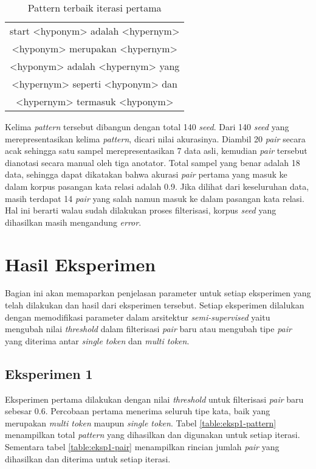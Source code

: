 \begin{table}
  \centering
  \caption{Pattern terbaik iterasi pertama}
  \label{table:pattern1}
  \begin{tabular}{|c|}
    \hline
      start <hyponym> adalah <hypernym> \\
      <hyponym> merupakan <hypernym> \\ 
      <hyponym> adalah <hypernym> yang \\
      <hypernym> seperti <hyponym> dan \\
      <hypernym> termasuk <hyponym> \\ \hline
  \end{tabular}
\end{table}

Kelima \textit{pattern} tersebut dibangun dengan total 140 \textit{seed}. Dari 140 \textit{seed} yang merepresentasikan kelima \textit{pattern}, dicari nilai akurasinya. Diambil 20 \textit{pair} secara acak sehingga satu sampel merepresentasikan 7 data asli, kemudian \textit{pair} tersebut dianotasi secara manual oleh tiga anotator. Total sampel yang benar adalah 18 data, sehingga dapat dikatakan bahwa akurasi \textit{pair} pertama yang masuk ke dalam korpus pasangan kata relasi adalah 0.9. Jika dilihat dari keseluruhan data, masih terdapat 14 \textit{pair} yang salah namun masuk ke dalam pasangan kata relasi. Hal ini berarti walau sudah dilakukan proses filterisasi, korpus \textit{seed} yang dihasilkan masih mengandung \textit{error}. 

%
\section{Hasil Eksperimen}
Bagian ini akan memaparkan penjelasan parameter untuk setiap eksperimen yang telah dilakukan dan hasil dari eksperimen tersebut. Setiap eksperimen dilalukan dengan memodifikasi parameter dalam arsitektur \textit{semi-supervised} yaitu mengubah nilai \textit{threshold} dalam filterisasi \textit{pair} baru atau mengubah tipe \textit{pair} yang diterima antar \textit{single token} dan \textit{multi token}.

\subsection{Eksperimen 1}
Eksperimen pertama dilakukan dengan nilai \textit{threshold} untuk filterisasi \textit{pair} baru sebesar 0.6. Percobaan pertama menerima seluruh tipe kata, baik yang merupakan \textit{multi token} maupun \textit{single token}. Tabel \ref{table:eksp1-pattern} menampilkan total \textit{pattern} yang dihasilkan dan digunakan untuk setiap iterasi. Sementara tabel \ref{table:eksp1-pair} menampilkan rincian jumlah \textit{pair} yang dihasilkan dan diterima untuk setiap iterasi.

